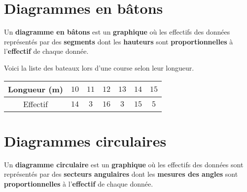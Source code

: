 \documentclass[a4paper,dvipsnames]{article}
\begin{document}
\section{Diagrammes en bâtons}

\begin{Def}
Un \textbf{diagramme en bâtons} est un \textbf{graphique} où les effectifs des données représentés par des \textbf{segments} dont les \textbf{hauteurs} sont \textbf{proportionnelles} à l'\textbf{effectif} de chaque donnée.
\end{Def}

\begin{Ex}
Voici la liste des bateaux lors d'une course selon leur longueur.
\begin{center}
\begin{tabular}{c||c|c|c|c|c|c}
Longueur (m) & $10$ & $11$ & $12$ & $13$ & $14$ & $15$ \\\hline
Effectif & $14$ & $3$ & $16$ & $3$ & $15$ & $5$ \\
\end{tabular}

\end{center}
\end{Ex}

\section{Diagrammes circulaires}

\begin{Def}
Un \textbf{diagramme circulaire} est un \textbf{graphique} où les effectifs des données sont représentés par des \textbf{secteurs angulaires} dont les \textbf{mesures des angles} sont \textbf{proportionnelles} à l'\textbf{effectif} de chaque donnée. 
\end{Def}
\end{document}
